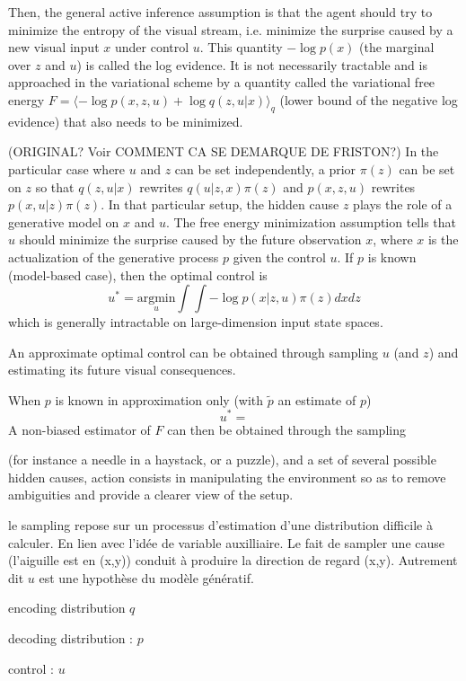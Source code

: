 \documentclass[12pt,twoside,openright]{article}
\begin{document}
	Then, the general active inference assumption is that the agent should try to minimize the entropy of the visual stream, i.e. minimize the surprise caused by a new visual input $x$ under control $u$. This quantity $-\log p(x)$ (the marginal over $z$ and $u$) is called the log evidence. It is not necessarily tractable and is approached in the variational scheme by a quantity called the variational free energy $F = \langle - \log p(x, z, u) + \log q (z, u| x)\rangle_q$ (lower bound of the negative log evidence) that also needs to be minimized. 
	
	{\color{blue} (ORIGINAL? Voir COMMENT CA SE DEMARQUE DE FRISTON?) In the particular case where $u$ and $z$ can be set independently, a prior $\pi(z)$ can be set on $z$ so that $q(z,u|x)$ rewrites $q(u|z,x)\pi(z)$ and $p(x, z, u)$ rewrites $p(x, u |z) \pi(z)$. In that particular setup, the hidden cause $z$ plays the role of a generative model on $x$ and $u$. The free energy minimization assumption tells that $u$ should minimize the surprise caused by the future observation $x$, where $x$ is the actualization of the generative process $p$ given the control $u$. 
	If $p$ is known (model-based case), then the optimal control is
	$$u^* = \underset{u}{\text{argmin}} \int \int - \log p(x|z, u) \pi(z) dx dz$$
	which is generally intractable on large-dimension input state spaces.
	
	An approximate optimal control can be obtained through sampling $u$ (and $z$) and estimating its future visual consequences.
	
	When $p$ is known in approximation only (with $\tilde{p}$ an estimate of $p$)
		$$u^* = $$ A non-biased estimator of $F$ can then be obtained through the sampling }
		

	
	(for instance a needle in a haystack, or a puzzle),  and a set of several possible hidden causes, action consists in manipulating the environment so as to remove ambiguities and provide a clearer view of the setup. 
	
	{\color{blue} le sampling repose sur un processus d'estimation d'une distribution difficile à calculer. En lien avec l'idée de variable auxilliaire. Le fait de sampler une cause (l'aiguille est en (x,y)) conduit à produire la direction de regard (x,y). Autrement dit $u$ est une hypothèse du modèle génératif. }
	
	encoding distribution $q$
	
	decoding distribution : $p$
	
	control : $u$
	
\end{document}

